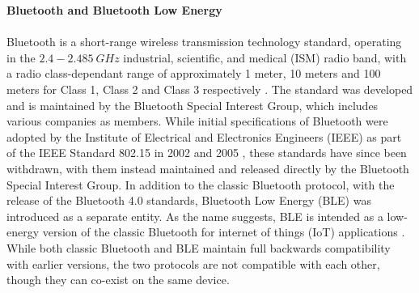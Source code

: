 \textbf{Bluetooth and Bluetooth Low Energy}\\\\
Bluetooth is a short-range wireless transmission technology standard, operating in the $2.4-2.485\ GHz$ industrial, scientific, and medical (ISM) radio band, with a radio class-dependant range of approximately 1 meter, 10 meters and 100 meters for Class 1, Class 2 and Class 3 respectively \citep[see][]{noauthor_basics_2012}. The standard was developed and is maintained by the Bluetooth Special Interest Group, which includes various companies as members. While initial specifications of Bluetooth were adopted by the Institute of Electrical and Electronics Engineers (IEEE) as part of the IEEE Standard 802.15 in 2002 \citep[Bluetooth 1.1,][]{noauthor_ieee_2002} and 2005 \citep[Bluetooth 1.2,][]{noauthor_ieee_2005}, these standards have since been withdrawn, with them instead maintained and released directly by the Bluetooth Special Interest Group. 
In addition to the classic Bluetooth protocol, with the release of the Bluetooth 4.0 standards, Bluetooth Low Energy (BLE) was introduced as a separate entity. As the name suggests, BLE is intended as a low-energy version of the classic Bluetooth for internet of things (IoT) applications \citep{noauthor_bluetooth_2017}.
While both classic Bluetooth and BLE maintain full backwards compatibility with earlier versions, the two protocols are not compatible with each other, though they can co-exist on the same device. \citep{noauthor_bluetooth_nodate-2}

